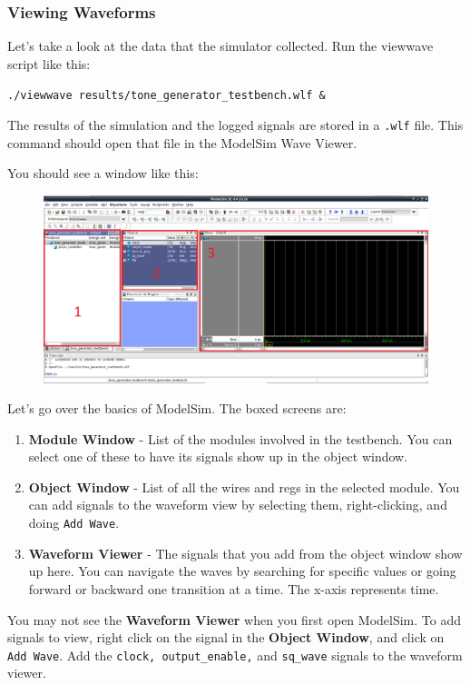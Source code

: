 \documentclass[11pt]{article}
\begin{document}
\subsubsection{Viewing Waveforms}

Let's take a look at the data that the simulator collected. Run the viewwave script like this:

\verb|./viewwave results/tone_generator_testbench.wlf &|

The results of the simulation and the logged signals are stored in a \verb|.wlf| file. This command should open that file in the ModelSim Wave Viewer.

You should see a window like this:

\begin{figure}[H]
	\centerline{\includegraphics[width=\textwidth]{figs/modelsim_new.png}}
\end{figure}

Let's go over the basics of ModelSim. The boxed screens are:

\begin{enumerate}
	\item \textbf{Module Window} - List of the modules involved in the testbench. You can select one of these to have its signals show up in the object window.
	\item \textbf{Object Window} - List of all the wires and regs in the selected module. You can add signals to the waveform view by selecting them, right-clicking, and doing \verb|Add Wave|.
	\item \textbf{Waveform Viewer} - The signals that you add from the object window show up here. You can navigate the waves by searching for specific values or going forward or backward one transition at a time. The x-axis represents time.
\end{enumerate}

You may not see the \textbf{Waveform Viewer} when you first open ModelSim. To add signals to view, right click on the signal in the \textbf{Object Window}, and click on \verb|Add Wave|. Add the \verb|clock, output_enable,| and \verb|sq_wave| signals to the waveform viewer.
\end{document}
